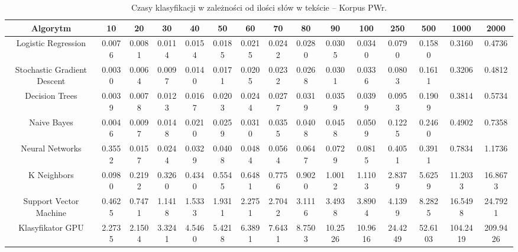 \begin{landscape}
	\begin{table}[H]
		\centering
		\caption{Czasy klasyfikacji w zależności od ilości słów w tekście -- Korpus PWr.}
		\begin{tabular}{ccccccccccccccc}
			\toprule
			\textbf{Algorytm} & \textbf{10} & \textbf{20} & \textbf{30} & \textbf{40} & \textbf{50} & \textbf{60} & \textbf{70} & \textbf{80} & \textbf{90} & \textbf{100} & \textbf{250} & \textbf{500} & \textbf{1000} & \textbf{2000} \\
			\midrule
            Logistic Regression & 0.0076 & 0.0081 & 0.0114 & 0.0154 & 0.0185 & 0.0215 & 0.0242 & 0.0280 & 0.0305 & 0.0340 & 0.0790 & 0.1580 & 0.3160 & 0.4736 \\
			Stochastic Gradient Descent & 0.0030 & 0.0064 & 0.0097 & 0.0140 & 0.0171 & 0.0205 & 0.0232 & 0.0268 & 0.0301 & 0.0336 & 0.0803 & 0.1611 & 0.3206 & 0.4812 \\
			Decision Trees & 0.0039 & 0.0078 & 0.0123 & 0.0167 & 0.0203 & 0.0244 & 0.0277 & 0.0319 & 0.0359 & 0.0399 & 0.0953 & 0.1909 & 0.3814 & 0.5734 \\
			Naive Bayes & 0.0046 & 0.0097 & 0.0148 & 0.0210 & 0.0259 & 0.0310 & 0.0355 & 0.0408 & 0.0458 & 0.0509 & 0.1225 & 0.2460 & 0.4902 & 0.7358 \\
			Neural Networks & 0.3552 & 0.0157 & 0.0244 & 0.0329 & 0.0408 & 0.0484 & 0.0564 & 0.0647 & 0.0729 & 0.0815 & 0.4051 & 0.3911 & 0.7834 & 1.1736 \\
			K Neighbors & 0.0980 & 0.2192 & 0.3260 & 0.4340 & 0.5545 & 0.6481 & 0.7756 & 0.9020 & 1.0012 & 1.1103 & 2.8379 & 5.6259 & 11.2033 & 16.8673 \\
			Support Vector Machine & 0.4625 & 0.7471 & 1.1418 & 1.5333 & 1.9311 & 2.2751 & 2.7042 & 3.1116 & 3.4938 & 3.8904 & 4.1399 & 8.2825 & 16.5498 & 24.7921 \\
			Klasyfikator GPU & 2.2735 & 2.1504 & 3.3241 & 4.5460 & 5.4218 & 6.3891 & 7.6431 & 8.7503 & 10.2526 & 10.9616 & 24.4249 & 52.6103 & 104.2419 & 209.9426 \\
			\bottomrule
		\end{tabular}
	\end{table}
	

\end{landscape}
